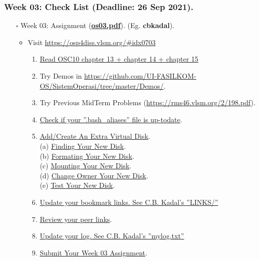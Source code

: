 \begin{frame}
\frametitle{Week 03: Check List (Deadline: 26 Sep 2021).}
\begin{itemize}
\item [$\square$] Week 03: Assignment (\href{https://os.vlsm.org/Slides/os03.pdf}{\textbf{os03.pdf}}).
(Eg. \textbf{cbkadal}).
\begin{itemize}
\item Visit \url{https://osp4diss.vlsm.org/\#idx0703}
\begin{enumerate}
\item \href{https://www.os-book.com/OS10/slide-dir/}{Read OSC10 chapter 13 + chapter 14 + chapter 15}
\item Try Demos in {\tiny \url{https://github.com/UI-FASILKOM-OS/SistemOperasi/tree/master/Demos/}}.
\item Try Previous MidTerm Problems {\tiny (\url{https://rms46.vlsm.org/2/198.pdf})}.
\item \href{https://osp4diss.vlsm.org/osp-108.html}{Check if your ''.bash\_aliases'' file is up-todate}. 
\item \href{https://osp4diss.vlsm.org/W03.html}{Add/Create An Extra Virtual Disk}.\\
(a) \href{https://osp4diss.vlsm.org/W03-01.html}{Finding Your New Disk}.\\
(b) \href{https://osp4diss.vlsm.org/W03-02.html}{Formating Your New Disk}.\\
(c) \href{https://osp4diss.vlsm.org/W03-03.html}{Mounting Your New Disk}.\\
(d) \href{https://osp4diss.vlsm.org/W03-04.html}{Change Owner Your New Disk}.\\
(e) \href{https://osp4diss.vlsm.org/W03-05.html}{Test Your New Disk}.\\
\item \href{https://cbkadal.github.io/os212/LINKS/}{Update your bookmark links. See C.B. Kadal's ''LINKS/''}
\item \href{https://osp4diss.vlsm.org/W02-05.html}{Review your peer links}.
\item \href{https://cbkadal.github.io/os212/TXT/mylog.txt}{Update your log. See C.B. Kadal's ''mylog.txt''}
\item \href{https://osp4diss.vlsm.org/W03-06.html}{Submit Your Week 03 Assignment}.
\end{enumerate}
\end{itemize}
\end{itemize}
\end{frame}


